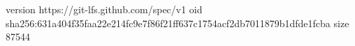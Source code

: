version https://git-lfs.github.com/spec/v1
oid sha256:631a404f35faa22e214fc9e7f86f21ff637c1754acf2db7011879b1dfde1fcba
size 87544
